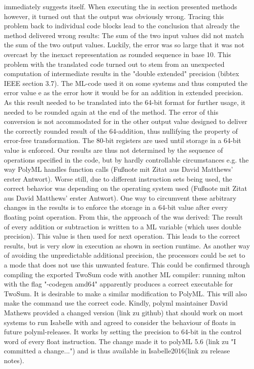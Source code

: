 \documentclass[11pt,a4paper]{article}
\begin{document}
immediately suggests itself. When executing the in section     presented methods however, it turned out that the output was obviously wrong. Tracing this problem back to individual code blocks lead to the conclusion that already the
method delivered wrong results: The sum of the two input values did not match the sum of the two output values. Luckily, the error was so large that it was not overcast by the inexact representation as rounded sequence in base 10.
This problem with the translated code turned out to stem from an unexpected computation of intermediate results in the "double extended" precision (bibtex IEEE section 3.7). The ML-code used it on some systems and thus computed the error value e as the error how it would be for an addition in extended precision. As this result needed to be translated into the 64-bit format for further usage, it needed to be rounded again at the end of the method. The error of this conversion is not accommodated for in the other output value designed to deliver the correctly rounded result of the 64-addition, thus nullifying the property of error-free transformation. The 80-bit registers are used until storage in a 64-bit value is enforced. Our results are thus not determined by the sequence of operations specified in the code, but by hardly controllable circumstances e.g. the way PolyML handles function calls (Fußnote mit Zitat aus David Matthews' erster Antwort). Worse still, due to different instruction sets being used, the correct behavior was depending on the operating system used (Fußnote mit Zitat aus David Matthews' erster Antwort). One way to circumvent these arbitrary changes in the results is to enforce the storage in a 64-bit value after every floating point operation. From this, the approach of the
was derived: The result of every addition or subtraction is written to a ML variable (which uses double precision). This value is then used for next operation. This leads to the correct results, but is very slow in execution as shown in section runtime.
As another way of avoiding the unpredictable additional precision, the processors could be set to a mode that does not use this unwanted feature. This could be confirmed through compiling the exported TwoSum code with another ML compiler: running mlton with the flag "-codegen amd64" apparently produces a correct executable for TwoSum. It is desirable to make a similar modification to PolyML. This will also make the
command use the correct code. Kindly, polyml maintainer David Mathews provided a changed version (link zu github) that should work on most systems to run Isabelle with and agreed to consider the behaviour of floats in future polyml-releases. It works by setting the precision to 64-bit in the control word of every float instruction. The change made it to polyML 5.6 (link zu "I committed a change...") and is thus available in Isabelle2016(link zu release notes).


%
%
\end{document}
